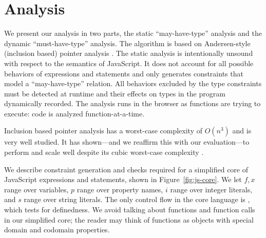 \section{Analysis}
\label{sec:analysis}

We present our analysis in two parts, the static ``may-have-type'' analysis
and the dynamic ``must-have-type'' analysis. The algorithm is based on
Andersen-style (inclusion based) pointer analysis \cite{AndersenPhD}. The
static analysis is
intentionally unsound with respect to the semantics of
JavaScript. It does not account for all possible behaviors of expressions and
statements and only generates constraints that model a ``may-have-type''
relation. All behaviors excluded by the type constraints must be detected at
runtime and their effects on types in the program dynamically recorded. The
analysis runs in the browser as functions are trying to execute: code is
analyzed function-at-a-time.

Inclusion based pointer analysis has a worst-case complexity of $O(n^3)$
and is very
well studied. It has shown---and we reaffirm this with our evaluation---to
perform and scale well despite its cubic worst-case complexity
\cite{Sridharan09}.

%
%
%
%
%
%

We describe constraint generation and checks required for a simplified core of
JavaScript expressions and statements, shown in Figure~\ref{fig:js-core}. We
let $f,x$ range over variables, $p$ range over property names, $i$ range over
integer literals, and $s$ range over string literals. The only control flow in
the core language is , which tests for definedness. We avoid talking
about functions and function calls in our simplified core; the reader may
think of functions as objects with special domain and codomain properties.

